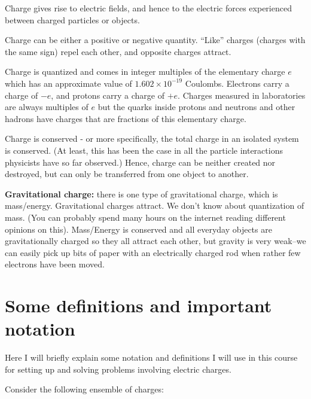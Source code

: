 \documentclass[
  letterpaper,
  DIV=11,
  numbers=noendperiod]{scrreprt}
\begin{document}
Charge gives rise to electric fields, and hence to the electric forces
experienced between charged particles or objects.

Charge can be either a positive or negative quantity. ``Like'' charges
(charges with the same sign) repel each other, and opposite charges
attract.

Charge is quantized and comes in integer multiples of the elementary
charge \(e\) which has an approximate value of
\(1.602 \times 10 ^{-19}\) Coulombs. Electrons carry a charge of \(-e\),
and protons carry a charge of \(+e\). Charges measured in laboratories
are always multiples of \(e\) but the quarks inside protons and neutrons
and other hadrons have charges that are fractions of this elementary
charge.

Charge is conserved - or more specifically, the total charge in an
isolated system is conserved. (At least, this has been the case in all
the particle interactions physicists have so far observed.) Hence,
charge can be neither created nor destroyed, but can only be transferred
from one object to another.

\textbf{Gravitational charge:} there is one type of gravitational
charge, which is mass/energy. Gravitational charges attract. We don't
know about quantization of mass. (You can probably spend many hours on
the internet reading different opinions on this). Mass/Energy is
conserved and all everyday objects are gravitationally charged so they
all attract each other, but gravity is very weak--we can easily pick up
bits of paper with an electrically charged rod when rather few electrons
have been moved.

\section{Some definitions and important
notation}\label{some-definitions-and-important-notation}

Here I will briefly explain some notation and definitions I will use in
this course for setting up and solving problems involving electric
charges.

Consider the following ensemble of charges:
\end{document}
